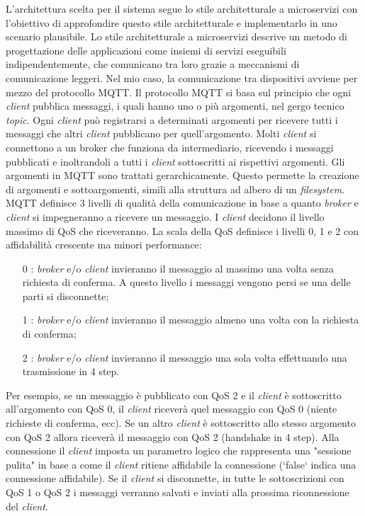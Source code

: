 L'architettura scelta per il sistema segue lo stile architetturale a microservizi con l'obiettivo di approfondire questo stile architetturale e implementarlo in uno scenario plausibile.
Lo stile architetturale a microservizi descrive un metodo di progettazione delle applicazioni come insiemi di servizi eseguibili indipendentemente, che comunicano tra loro grazie a meccanismi di comunicazione leggeri.
Nel mio caso, la comunicazione tra dispositivi avviene per mezzo del protocollo MQTT. Il protocollo MQTT si basa sul principio che ogni \emph{client} pubblica messaggi, i quali hanno uno o più argomenti, nel gergo tecnico \emph{topic}.
Ogni \emph{client} può registrarsi a determinati argomenti per ricevere tutti i messaggi che altri \emph{client} pubblicano per quell'argomento. Molti \emph{client} si connettono a un \gls{broker} che funziona da intermediario, ricevendo i messaggi pubblicati e inoltrandoli a tutti i \emph{client} sottoscritti ai rispettivi argomenti.
Gli argomenti in MQTT sono trattati gerarchicamente. Questo permette la creazione di argomenti e sottoargomenti, simili alla struttura ad albero di un \emph{filesystem}.
MQTT definisce 3 livelli di qualità della comunicazione in base a quanto \emph{broker} e \emph{client} si impegneranno a ricevere un messaggio.
I \emph{client} decidono il livello massimo di \gls{QoS} che riceveranno.
La scala della QoS definisce i livelli 0, 1 e 2 con affidabilità crescente ma minori performance:
\begin{itemize}
	\item [0]: \emph{broker} e/o \emph{client} invieranno il messaggio al massimo una volta senza richiesta di conferma. A questo livello i messaggi vengono persi se una delle parti si disconnette;
	\item [1]: \emph{broker} e/o \emph{client} invieranno il messaggio almeno una volta con la richiesta di conferma;
	\item [2]: \emph{broker} e/o \emph{client} invieranno il messaggio una sola volta effettuando una trasmissione in 4 step.
\end{itemize}

Per esempio, se un messaggio è pubblicato con QoS 2 e il \emph{client} è sottoscritto all'argomento con QoS 0, il \emph{client} riceverà quel messaggio con QoS 0 (niente richieste di conferma, ecc).
Se un altro \emph{client} è sottoscritto allo stesso argomento con QoS 2 allora riceverà il messaggio con QoS 2 (\gls{handshake} in 4 step).
Alla connessione il \emph{client} imposta un parametro logico che rappresenta una "sessione pulita" in base a come il \emph{client} ritiene affidabile la connessione (`false` indica una connessione affidabile). Se il \emph{client} si disconnette, in tutte le sottoscrizioni con QoS 1 o QoS 2 i messaggi verranno salvati e inviati alla prossima riconnessione del \emph{client}.

